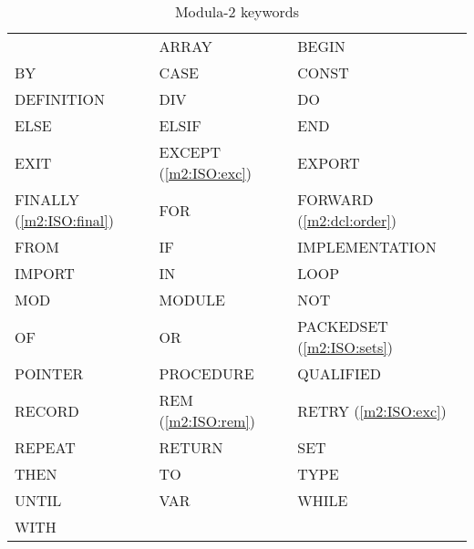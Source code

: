 \begin{table}[bht]
\begin{center}
\ifonline
\begin{tabular}{lll}
\else
\begin{tabular}{p{3.4cm}p{3.4cm}p{3.4cm}}
\fi
AND             & ARRAY                     & BEGIN           \\
BY              & CASE                      & CONST           \\
DEFINITION      & DIV                       & DO              \\
ELSE            & ELSIF                     & END             \\
EXIT            & EXCEPT (\ref{m2:ISO:exc}) & EXPORT          \\
FINALLY (\ref{m2:ISO:final}) & FOR          & FORWARD (\ref{m2:dcl:order})  \\
FROM            & IF                        & IMPLEMENTATION  \\
IMPORT          & IN                        & LOOP            \\
MOD             & MODULE                    & NOT             \\
OF              & OR                        & PACKEDSET (\ref{m2:ISO:sets}) \\
POINTER         & PROCEDURE                 & QUALIFIED             \\
RECORD          & REM (\ref{m2:ISO:rem})    & RETRY (\ref{m2:ISO:exc}) \\
REPEAT          & RETURN                    & SET                   \\
THEN            & TO                        & TYPE                  \\
UNTIL           & VAR                       & WHILE                 \\
WITH            
\end{tabular}
\end{center}
\caption{Modula-2 keywords}\label{table:m2:ISO:keywords}
\end{table}

